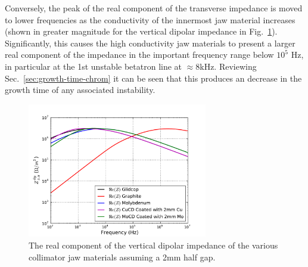 Conversely, the peak of the real component of the transverse impedance is moved to lower frequencies as the conductivity of the innermost jaw material increases (shown in greater magnitude for the vertical dipolar impedance in Fig.~\ref{fig:phase-2-vertdip-zoom}). Significantly, this causes the high conductivity jaw materials to present a larger real component of the impedance in the important frequency range below $10^{5}$ Hz, in particular at the 1st unstable betatron line at $\approx8$kHz. Reviewing Sec.~\ref{sec:growth-time-chrom} it can be seen that this produces an decrease in the growth time of any associated instability. 

\begin{figure}
\begin{center}
\includegraphics[width=0.7\textwidth]{LHC_Collimation_Upgrades/figures/vertDipolarZoom.pdf}
\end{center}
\caption{The real component of the vertical dipolar impedance of the various collimator jaw materials assuming a 2mm half gap.}
\label{fig:phase-2-vertdip-zoom}
\end{figure}
